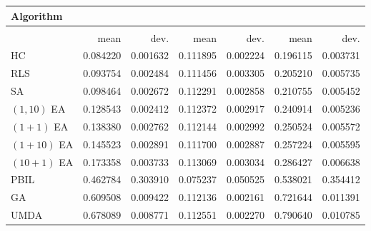 \begin{tabular}{@{} l *{6}{>{{}}N{1}{2}} @{}}
\toprule
{Algorithm} &  \\
\midrule
&  &  &  \\
\midrule
& {mean} & {dev.} & {mean} & {dev.} & {mean} & {dev.} \\
\midrule
HC & 0.084220 & 0.001632 & 0.111895 & 0.002224 & 0.196115 & 0.003731 \\
RLS & 0.093754 & 0.002484 & 0.111456 & 0.003305 & 0.205210 & 0.005735 \\
SA & 0.098464 & 0.002672 & 0.112291 & 0.002858 & 0.210755 & 0.005452 \\
$(1,10)$ EA & 0.128543 & 0.002412 & 0.112372 & 0.002917 & 0.240914 & 0.005236 \\
$(1+1)$ EA & 0.138380 & 0.002762 & 0.112144 & 0.002992 & 0.250524 & 0.005572 \\
$(1+10)$ EA & 0.145523 & 0.002891 & 0.111700 & 0.002887 & 0.257224 & 0.005595 \\
$(10+1)$ EA & 0.173358 & 0.003733 & 0.113069 & 0.003034 & 0.286427 & 0.006638 \\
PBIL & 0.462784 & 0.303910 & 0.075237 & 0.050525 & 0.538021 & 0.354412 \\
GA & 0.609508 & 0.009422 & 0.112136 & 0.002161 & 0.721644 & 0.011391 \\
UMDA & 0.678089 & 0.008771 & 0.112551 & 0.002270 & 0.790640 & 0.010785 \\
\bottomrule
\end{tabular}
